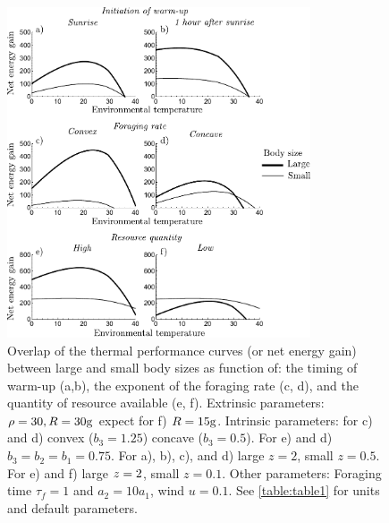 \begin{figure}
\centering \includegraphics[width=0.8\textwidth]{fig5}
\caption{
    \setstretch{\stretchby}
	Overlap of the thermal performance curves (or net energy gain) between large and small body sizes as function of: the timing of warm-up (a,b), the exponent of the foraging rate (c, d), and the quantity of resource available (e, f).
	Extrinsic parameters:
	$\rho = 30, R = 30 \rm{g}$ expect for f) $R = 15 \rm{g}$.
	Intrinsic parameters:
	for c) and d) convex ($b_3 = 1.25$) concave ($b_3 = 0.5$).
	For e) and d) $b_3 = b_2 = b_1 = 0.75$.
	For a), b), c), and d) large $z = 2$, small $z = 0.5$.
	For e) and f) large $z = 2 \rm$, small $z = 0.1$.
	Other parameters:
	Foraging time $\tau_f = 1$ and $a_2 = 10 a_1$, wind $u = 0.1$.
	See \cref{table:table1} for units and default parameters.
}
\label{fig5}
\end{figure}


